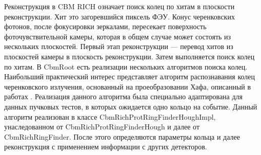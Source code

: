 Реконструкция в CBM RICH означает поиск колец по хитам в плоскости реконструкции. Хит это загоревшийся пиксель ФЭУ. Конус черенковских фотонов, после фокусировки зеркалами, пересекает поверхность фоточувствительной камеры, которая в общем случае может состоять из нескольких плоскостей. Первый этап реконструкции --- перевод хитов из плоскостей камеры в плоскость реконструкции. Затем выполняется поиск колец по хитам. В CbmRoot есть реализации нескольких алгоритмов поиска колец. Наибольший практический интерес представляет алгоритм распознавания колец черенковского излучения, основанный на проеобразовании Хафа, описанный в работах \cite{RECOPEPAN, RECO2}. Реализация данного алгоритма была специально адаптирована для данных пучковых тестов, в которых ожидается одно кольцо на событие. Данный алгоритм реализован в классе CbmRichProtRingFinderHoughImpl, унаследованном от CbmRichProtRingFinderHough и далее от CbmRichRingFinder. После этого определяются параметры кольца и далее реконструкция с применением информации с других детекторов.

